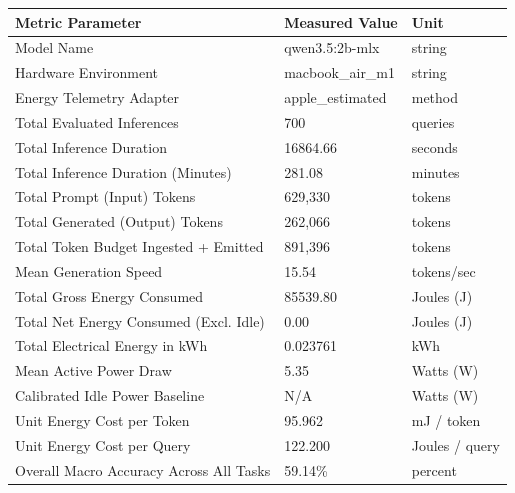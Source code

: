 \begin{tabular}{lll}
\toprule
Metric Parameter & Measured Value & Unit \\
\midrule
Model Name & qwen3.5:2b-mlx & string \\
Hardware Environment & macbook\_air\_m1 & string \\
Energy Telemetry Adapter & apple\_estimated & method \\
Total Evaluated Inferences & 700 & queries \\
Total Inference Duration & 16864.66 & seconds \\
Total Inference Duration (Minutes) & 281.08 & minutes \\
Total Prompt (Input) Tokens & 629,330 & tokens \\
Total Generated (Output) Tokens & 262,066 & tokens \\
Total Token Budget Ingested + Emitted & 891,396 & tokens \\
Mean Generation Speed & 15.54 & tokens/sec \\
Total Gross Energy Consumed & 85539.80 & Joules (J) \\
Total Net Energy Consumed (Excl. Idle) & 0.00 & Joules (J) \\
Total Electrical Energy in kWh & 0.023761 & kWh \\
Mean Active Power Draw & 5.35 & Watts (W) \\
Calibrated Idle Power Baseline & N/A & Watts (W) \\
Unit Energy Cost per Token & 95.962 & mJ / token \\
Unit Energy Cost per Query & 122.200 & Joules / query \\
Overall Macro Accuracy Across All Tasks & 59.14\% & percent \\
\bottomrule
\end{tabular}

